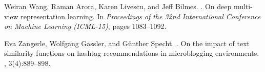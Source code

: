 \documentclass{article}
\begin{document}
\begin{thebibliography}{}
Weiran Wang, Raman Arora, Karen Livescu, and Jeff Bilmes.
.
\newblock On deep multi-view representation learning.
\newblock In {\em Proceedings of the 32nd International Conference on Machine
  Learning (ICML-15)}, pages 1083--1092.

Eva Zangerle, Wolfgang Gassler, and G{\"u}nther Specht.
.
\newblock On the impact of text similarity functions on hashtag recommendations
  in microblogging environments.
, 3(4):889--898.

\end{thebibliography}


\end{document}
